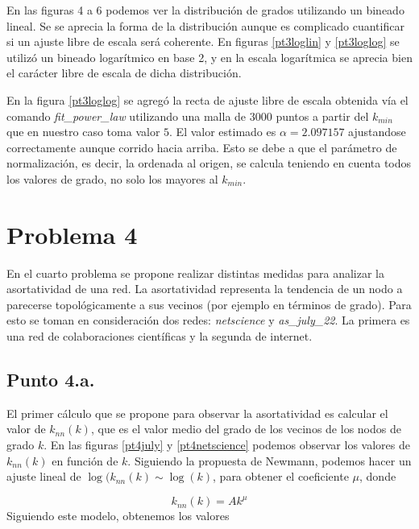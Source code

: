 \documentclass{article}
\begin{document}
En las figuras 4 a 6 podemos ver la distribución de grados utilizando un bineado lineal. Se se aprecia la forma de la distribución aunque es complicado cuantificar si un ajuste libre de escala será coherente. En figuras \ref{pt3loglin} y \ref{pt3loglog} se utilizó un bineado logarítmico en base 2, y en la escala logarítmica se aprecia bien el carácter libre de escala de dicha distribución.

En la figura \ref{pt3loglog} se agregó la recta de ajuste libre de escala obtenida vía el comando \textit{fit\_power\_law} utilizando una malla de $3000$ puntos a partir del $k_{min}$ que en nuestro caso toma valor $5$. El valor estimado es $\alpha=2.097157$ ajustandose correctamente aunque corrido hacia arriba. Esto se debe a que el parámetro de normalización, es decir, la ordenada al origen, se calcula teniendo en cuenta todos los valores de grado, no solo los mayores al $k_{min}$.

\section{Problema 4}
En el cuarto problema se propone realizar distintas medidas para analizar la asortatividad de una red. La asortatividad representa la tendencia de un nodo a parecerse topológicamente a sus vecinos (por ejemplo en términos de grado). Para esto se toman en consideración dos redes: \textit{netscience} y \textit{as\_july\_22}. La primera es una red de colaboraciones científicas y la segunda de internet.

\subsection{Punto 4.a.}
El primer cálculo que se propone para observar la asortatividad es calcular el valor de $k_{nn}(k)$, que es el valor medio del grado de los vecinos de los nodos de grado $k$. En las figuras \ref{pt4july} y \ref{pt4netscience} podemos observar los valores de $k_{nn}(k)$ en función de $k$. Siguiendo la propuesta de Newmann, podemos hacer un ajuste lineal de $\log(k_{nn}(k) \sim \log (k)$, para obtener el coeficiente $\mu$, donde

\begin{equation}
k_{nn}(k) = A k^\mu
\end{equation}
Siguiendo este modelo, obtenemos los valores 
\end{document}
